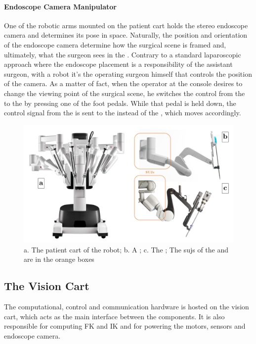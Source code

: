 \documentclass[../main.tex]{subfiles}
\begin{document}
\paragraph{Endoscope Camera Manipulator} One of the robotic arms mounted on the patient cart holds the stereo endoscope camera and determines its pose in space. Naturally, the position and orientation of the endoscope camera determine how the surgical scene is framed and, ultimately, what the surgeon sees in the \hrsv. Contrary to a standard laparoscopic approach where the endoscope placement is a responsibility of the assistant surgeon, with a \davinci robot it's the operating surgeon himself that controls the position of the camera. As a matter of fact, when the operator at the console desires to change the viewing point of the surgical scene, he switches the control from the \psms to the \ecm by pressing one of the foot pedals. While that pedal is held down, the control signal from the \mtms is sent to the \ecm instead of the \psms, which moves accordingly.

\begin{figure}[h]
    \centering
    \includegraphics[width=\textwidth]{images/patient_cart_panel.png}
    \caption{a. The patient cart of the \davinci robot; b. A \psm; c. The \ecm; The \acp{suj} of the \psm and \ecm are in the orange boxes}
    \label{fig:patientcartpanel}
\end{figure}

\subsection{The Vision Cart} 
The computational, control and communication hardware is hosted on the vision cart, which acts as the main interface between the components. It is also responsible for computing FK and IK and for powering the motors, sensors and endoscope camera.
\end{document}
